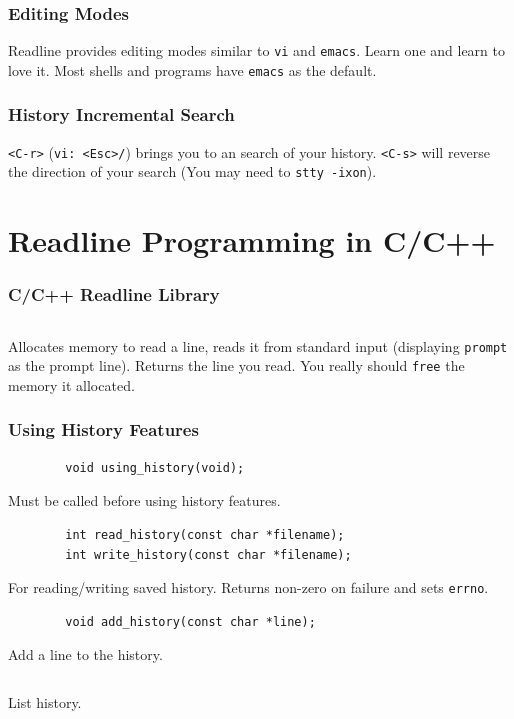 \documentclass[aspectratio=1610]{beamer}
\begin{document}
\begin{frame}
    \frametitle{Editing Modes}
    Readline provides editing modes similar to \texttt{vi} and \texttt{emacs}.
    Learn one and learn to love it. Most shells and programs have
    \texttt{emacs} as the default.
\end{frame}

\begin{frame}
    \frametitle{History Incremental Search}
    \texttt{<C-r>} (\texttt{vi: <Esc>/}) brings you to an search of your
    history. \texttt{<C-s>} will reverse the direction of your search (You may
    need to \texttt{stty -ixon}).
\end{frame}

\section{Readline Programming in C/C++}

\begin{frame}[fragile=singleslide]
    \frametitle{C/C++ Readline Library}
    \inputminted{c}{codesnip/readlineinclude.c}

    Allocates memory to read a line, reads it from standard input (displaying
    \texttt{prompt} as the prompt line). Returns the line you read. You
    really should \texttt{free} the memory it allocated.
\end{frame}

\begin{frame}[fragile]
    \frametitle{Using History Features}
    \begin{verbatim}
        void using_history(void);
    \end{verbatim}
    Must be called before using history features.
    \pause

    \begin{verbatim}
        int read_history(const char *filename);
        int write_history(const char *filename);
    \end{verbatim}
    For reading/writing saved history. Returns non-zero on failure and sets
    \texttt{errno}.
    \pause

    \begin{verbatim}
        void add_history(const char *line);
    \end{verbatim}
    Add a line to the history.
    \pause

    \inputminted{c}{codesnip/historylist.c}
    List history.
\end{frame}
\end{document}
